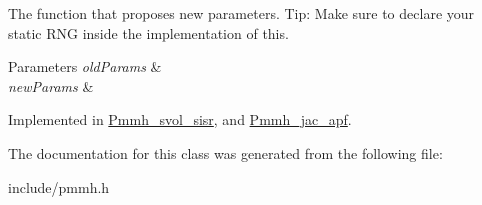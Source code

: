 The function that proposes new parameters. Tip\+: Make sure to declare your static R\+NG inside the implementation of this. 


\begin{DoxyParams}{Parameters}
{\em old\+Params} & \\
\hline
{\em new\+Params} & \\
\hline
\end{DoxyParams}


Implemented in \hyperlink{classPmmh__svol__sisr_a18df26cb5c0bddefbd24866b1b4ff142}{Pmmh\+\_\+svol\+\_\+sisr}, and \hyperlink{classPmmh__jac__apf_a0127e07b0f9ba6b042418c575b78ca55}{Pmmh\+\_\+jac\+\_\+apf}.



The documentation for this class was generated from the following file\+:\begin{DoxyCompactItemize}
\item 
include/pmmh.\+h\end{DoxyCompactItemize}
